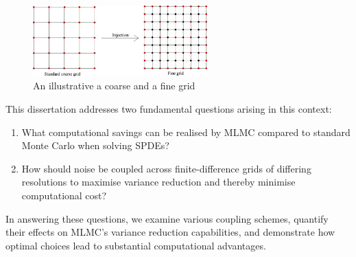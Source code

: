 \begin{figure}[htbp]
    \centering
    \includegraphics[width=0.6\textwidth]{graphics/fine_grid_vs_coarse_grid.png}
    \caption{An illustrative a coarse and a fine grid}
    \label{fig:coarse_vs_fine_grid}
\end{figure}


\medskip
This dissertation addresses two fundamental questions arising in this context:

\begin{enumerate}
\item What computational savings can be realised by MLMC compared to standard Monte Carlo when solving SPDEs?
\item How should noise be coupled across finite-difference grids of differing resolutions to maximise variance reduction and thereby minimise computational cost?
\end{enumerate}

In answering these questions, we examine various coupling schemes, quantify their effects on MLMC's variance reduction capabilities, and demonstrate how optimal choices lead to substantial computational advantages.
